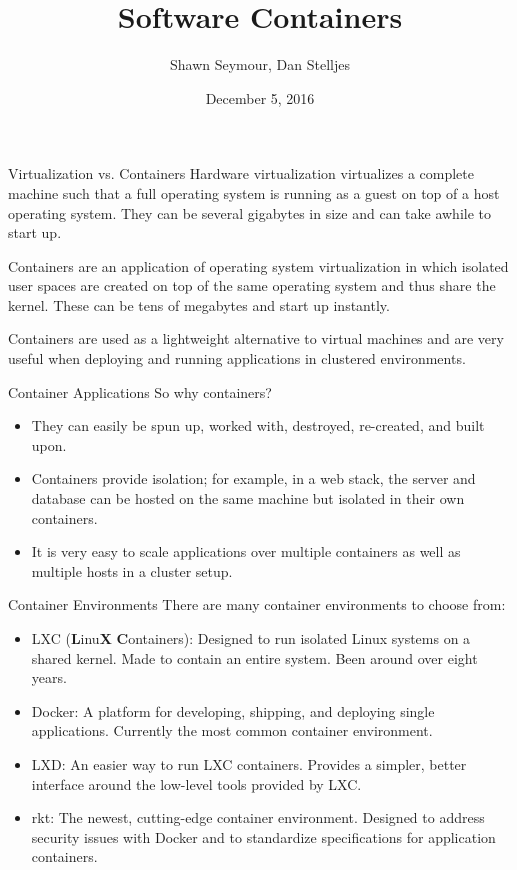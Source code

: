 \documentclass[xcolor=dvipsnames,aspectratio=1610]{beamer}
\title{Software Containers}
\date{December 5, 2016}
\author{Shawn Seymour, Dan Stelljes}
\begin{document}
  \maketitle
  \begin{frame}{Virtualization vs. Containers}
      Hardware virtualization virtualizes a complete machine such that a full operating system is running as a guest on top of a host operating system. They can be several gigabytes in size and can take awhile to start up.\newline

      Containers are an application of operating system virtualization in which isolated user spaces are created on top of the same operating system and thus share the kernel. These can be tens of megabytes and start up instantly.\newline

      Containers are used as a lightweight alternative to virtual machines and are very useful when deploying and running applications in clustered environments.
  \end{frame}

  \begin{frame}{Container Applications}
    So why containers?

    \begin{itemize}
        \item They can easily be spun up, worked with, destroyed, re-created, and built upon.
        \item Containers provide isolation; for example, in a web stack, the server and database can be hosted on the same machine but isolated in their own containers.
        \item It is very easy to scale applications over multiple containers as well as multiple hosts in a cluster setup.
    \end{itemize}
  \end{frame}

  \begin{frame}{Container Environments}
    There are many container environments to choose from:

    \begin{itemize}
        \item \alert{LXC} (\textbf{L}inu\textbf{X} \textbf{C}ontainers): Designed to run isolated Linux systems on a shared kernel. Made to contain an entire system. Been around over eight years.
        \item \alert{Docker}: A platform for developing, shipping, and deploying single applications. Currently the most common container environment.
        \item \alert{LXD}: An easier way to run LXC containers. Provides a simpler, better interface around the low-level tools provided by LXC.
        \item \alert{rkt}: The newest, cutting-edge container environment. Designed to address security issues with Docker and to standardize specifications for application containers.
    \end{itemize}
  \end{frame}
\end{document}
